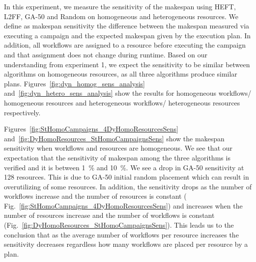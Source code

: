 In this experiment, we measure the sensitivity of the makespan using HEFT, L2FF, GA-50 and Random on homogeneous and heterogeneous resources.
We define as makespan sensitivity the difference between the makespan measured via executing a campaign and the expected makespan given by the execution plan.
In addition, all workflows are assigned to a resource before executing the campaign and that assignment does not change during runtime.
Based on our understanding from experiment 1, we expect the sensitivity to be similar between algorithms on homogeneous resources, as all three algorithms produce similar plans.
Figures~\ref{fig:dyn_homog_sens_analysis} and~\ref{fig:dyn_hetero_sens_analysis} show the results for homogeneous workflows/ homogeneous resources and heterogeneous workflows/ heterogeneous resources respectively.

Figures~\ref{fig:StHomoCampaigns_4DyHomoResourcesSens} and~\ref{fig:DyHomoResources_StHomoCampaignsSens} show the makespan sensitivity when workflows and resources are homogeneous.
We see that our expectation that the sensitivity of makespan among the three algorithms is verified and it is between 1~\% and 10~\%.
We see a drop in GA-50 sensitivity at 128 resources.
This is due to GA-50 initial random placement which can result in overutilizing of some resources.
In addition, the sensitivity drops as the number of workflows increase and the number of resources is constant ( Fig.~\ref{fig:StHomoCampaigns_4DyHomoResourcesSens}) and increases when the number of resources increase and the number of workflows is constant (Fig.~\ref{fig:DyHomoResources_StHomoCampaignsSens}).
This leads us to the conclusion that as the average number of workflows per resource increases the sensitivity decreases regardless how many workflows are placed per resource by a plan.


